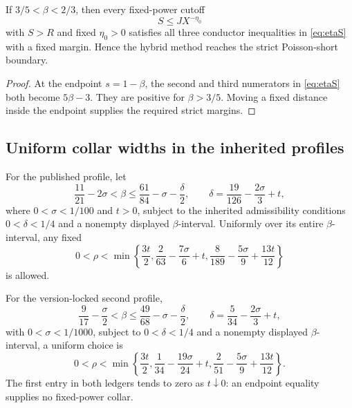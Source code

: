 \begin{corollary}
\label{cor:poisson-frontier}
If \(3/5<\beta<2/3\), then every fixed-power cutoff
\begin{equation}
 S\le JX^{-\eta_0}
 \label{eq:near-J-cutoff}
\end{equation}
with \(S>R\) and fixed \(\eta_0>0\) satisfies all three conductor
inequalities in \eqref{eq:etaS} with a fixed margin.  Hence the hybrid
method reaches the strict Poisson-short boundary.
\end{corollary}

\begin{proof}
At the endpoint \(s=1-\beta\), the second and third numerators in
\eqref{eq:etaS} both become \(5\beta-3\).  They are positive for
\(\beta>3/5\).  Moving a fixed distance inside the endpoint supplies
the required strict margins.
\end{proof}

\subsection{Uniform collar widths in the inherited profiles}

For the published profile, let
\begin{equation}
 \frac{11}{21}-2\sigma<\beta
 \le\frac{61}{84}-\sigma-\frac\delta2,
 \qquad
 \delta=\frac{19}{126}-\frac{2\sigma}{3}+t,
 \label{eq:published-profile}
\end{equation}
where \(0<\sigma<1/100\) and \(t>0\), subject to the inherited
admissibility conditions \(0<\delta<1/4\) and a nonempty displayed
\(\beta\)-interval.  Uniformly over its entire
\(\beta\)-interval, any fixed
\begin{equation}
 0<\rho<\min\left\{
 \frac{3t}{2},
 \frac{2}{63}-\frac{7\sigma}{6}+t,
 \frac{8}{189}-\frac{5\sigma}{9}+\frac{13t}{12}
 \right\}
 \label{eq:published-rho}
\end{equation}
is allowed.

For the version-locked second profile,
\begin{equation}
 \frac9{17}-\frac\sigma2<\beta
 \le\frac{49}{68}-\sigma-\frac\delta2,
 \qquad
 \delta=\frac5{34}-\frac{2\sigma}{3}+t,
 \label{eq:li-profile}
\end{equation}
with \(0<\sigma<1/1000\), subject to \(0<\delta<1/4\) and a nonempty
displayed \(\beta\)-interval, a uniform choice is
\begin{equation}
 0<\rho<\min\left\{
 \frac{3t}{2},
 \frac1{34}-\frac{19\sigma}{24}+t,
 \frac2{51}-\frac{5\sigma}{9}+\frac{13t}{12}
 \right\}.
 \label{eq:li-rho}
\end{equation}
The first entry in both ledgers tends to zero as \(t\downarrow0\): an
endpoint equality supplies no fixed-power collar.
